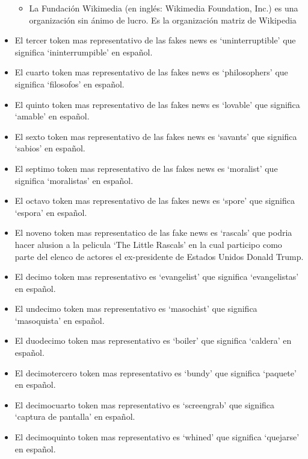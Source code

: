 \documentclass[
  11pt,
  a4paper,
]{article}
\providecommand{\tightlist}{%
  \setlength{\itemsep}{0pt}\setlength{\parskip}{0pt}}
\begin{document}
\begin{itemize}
  \begin{itemize}
  \tightlist
  \item
    La Fundación Wikimedia (en inglés: Wikimedia Foundation, Inc.) es
    una organización sin ánimo de lucro. Es la organización matriz de
    Wikipedia
  \end{itemize}
\item
  El tercer token mas representativo de las fakes news es
  `uninterruptible' que significa `ininterrumpible' en español.
\item
  El cuarto token mas representativo de las fakes news es `philosophers'
  que significa `filosofos' en español.
\item
  El quinto token mas representativo de las fakes news es `lovable' que
  significa `amable' en español.
\item
  El sexto token mas representativo de las fakes news es `savants' que
  significa `sabios' en español.
\item
  El septimo token mas representativo de las fakes news es `moralist'
  que significa `moralistas' en español.
\item
  El octavo token mas representativo de las fakes news es `spore' que
  significa `espora' en español.
\item
  El noveno token mas representatico de las fake news es `rascals' que
  podria hacer alusion a la pelicula `The Little Rascals' en la cual
  participo como parte del elenco de actores el ex-presidente de Estados
  Unidos Donald Trump.
\item
  El decimo token mas representativo es `evangelist' que significa
  `evangelistas' en español.
\item
  El undecimo token mas representativo es `masochist' que significa
  `masoquista' en español.
\item
  El duodecimo token mas representativo es `boiler' que significa
  `caldera' en español.
\item
  El decimotercero token mas representativo es `bundy' que significa
  `paquete' en español.
\item
  El decimocuarto token mas representativo es `screengrab' que significa
  `captura de pantalla' en español.
\item
  El decimoquinto token mas representativo es `whined' que significa
  `quejarse' en español.
\end{itemize}
\end{document}
